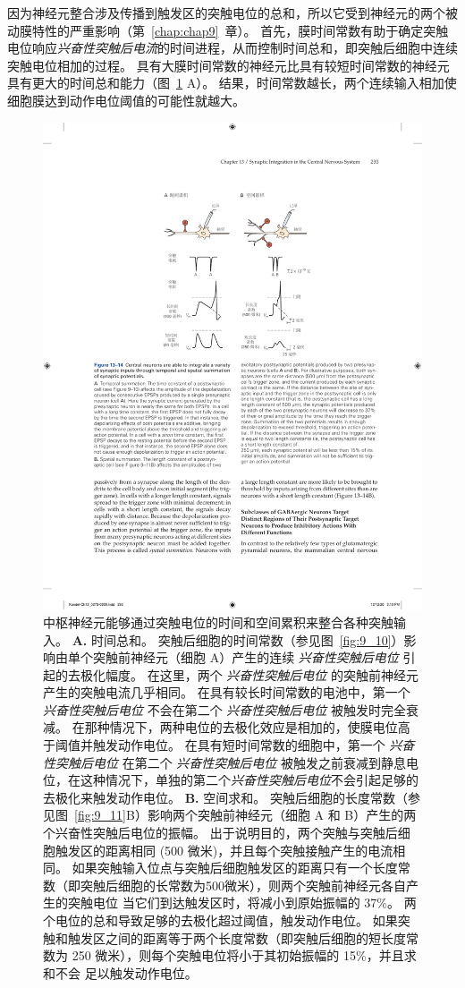 因为神经元整合涉及传播到触发区的突触电位的总和，所以它受到神经元的两个被动膜特性的严重影响（第~\ref{chap:chap9}~章）。
首先，膜时间常数有助于确定突触电位响应\textit{兴奋性突触后电流}的时间进程，从而控制时间总和，即突触后细胞中连续突触电位相加的过程。
具有大膜时间常数的神经元比具有较短时间常数的神经元具有更大的时间总和能力（图~\ref{fig:13_14} A）。
结果，时间常数越长，两个连续输入相加使细胞膜达到动作电位阈值的可能性就越大。


\begin{figure}[htbp]
	\centering
	\includegraphics[width=0.65\linewidth]{chap13/fig_13_14}
	\caption{中枢神经元能够通过突触电位的时间和空间累积来整合各种突触输入。
		\textbf{A.} 时间总和。
		突触后细胞的时间常数（参见图~\ref{fig:9_10}）影响由单个突触前神经元（细胞 A）产生的连续 \textit{兴奋性突触后电位} 引起的去极化幅度。
		在这里，两个 \textit{兴奋性突触后电位} 的突触前神经元产生的突触电流几乎相同。
		在具有较长时间常数的电池中，第一个 \textit{兴奋性突触后电位} 不会在第二个 \textit{兴奋性突触后电位} 被触发时完全衰减。
		在那种情况下，两种电位的去极化效应是相加的，使膜电位高于阈值并触发动作电位。
		在具有短时间常数的细胞中，第一个 \textit{兴奋性突触后电位} 在第二个 \textit{兴奋性突触后电位} 被触发之前衰减到静息电位，在这种情况下，单独的第二个\textit{兴奋性突触后电位}不会引起足够的去极化来触发动作电位。
		\textbf{B.} 空间求和。
		突触后细胞的长度常数（参见图~\ref{fig:9_11}B）影响两个突触前神经元（细胞 A 和 B）产生的两个兴奋性突触后电位的振幅。
		出于说明目的，两个突触与突触后细胞触发区的距离相同 (500 微米)，并且每个突触接触产生的电流相同。
		如果突触输入位点与突触后细胞触发区的距离只有一个长度常数（即突触后细胞的长常数为500微米），则两个突触前神经元各自产生的突触电位 当它们到达触发区时，将减小到原始振幅的 37\%。
		两个电位的总和导致足够的去极化超过阈值，触发动作电位。
		如果突触和触发区之间的距离等于两个长度常数（即突触后细胞的短长度常数为 250 微米），则每个突触电位将小于其初始振幅的 15\%，并且求和不会 足以触发动作电位。}
	\label{fig:13_14}
\end{figure}


